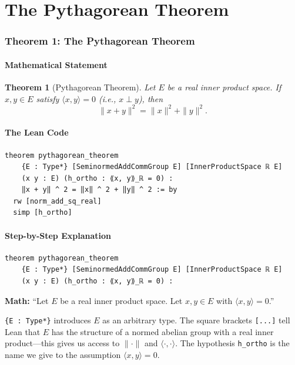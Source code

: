 \documentclass[11pt]{article}
\theoremstyle{plain}
\newtheorem{theorem}{Theorem}[section]
\theoremstyle{definition}
\begin{document}
\part{The Pythagorean Theorem}

\section{Theorem 1: The Pythagorean Theorem}

\subsection{Mathematical Statement}

\begin{theorem}[Pythagorean Theorem]
Let $E$ be a real inner product space. If $x, y \in E$ satisfy
$\langle x, y \rangle = 0$ (i.e., $x \perp y$), then
\[
  \|x + y\|^2 = \|x\|^2 + \|y\|^2.
\]
\end{theorem}

\subsection{The Lean Code}

\begin{lstlisting}
theorem pythagorean_theorem
    {E : Type*} [SeminormedAddCommGroup E] [InnerProductSpace ℝ E]
    (x y : E) (h_ortho : ⟪x, y⟫_ℝ = 0) :
    ‖x + y‖ ^ 2 = ‖x‖ ^ 2 + ‖y‖ ^ 2 := by
  rw [norm_add_sq_real]
  simp [h_ortho]
\end{lstlisting}

\subsection{Step-by-Step Explanation}

\begin{tcolorbox}[title=Line 1--3: Declaration and hypotheses]
\begin{lstlisting}
theorem pythagorean_theorem
    {E : Type*} [SeminormedAddCommGroup E] [InnerProductSpace ℝ E]
    (x y : E) (h_ortho : ⟪x, y⟫_ℝ = 0) :
\end{lstlisting}
\textbf{Math:} ``Let $E$ be a real inner product space. Let $x, y \in E$ with
$\langle x, y\rangle = 0$.''

\texttt{\{E : Type*\}} introduces $E$ as an arbitrary type.
The square brackets \texttt{[...]} tell Lean that $E$ has the structure of a
normed abelian group with a real inner product---this gives us access to
$\|{\cdot}\|$ and $\langle{\cdot},{\cdot}\rangle$.
The hypothesis \texttt{h\_ortho} is the name we give to the assumption
$\langle x,y\rangle = 0$.
\end{tcolorbox}
\end{document}
